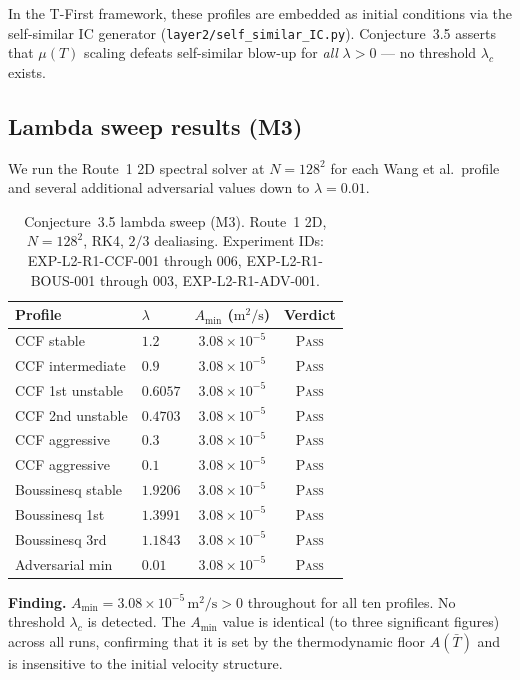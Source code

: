 \documentclass[12pt]{article}
\newcommand{\Amin}{A_{\min}}
\begin{document}
In the T-First framework, these profiles are embedded as initial conditions via the
self-similar IC generator (\texttt{layer2/self\_similar\_IC.py}).  Conjecture~3.5
asserts that $\mu(T)$ scaling defeats self-similar blow-up for \emph{all}
$\lambda > 0$ --- no threshold $\lambda_c$ exists.

\subsection{Lambda sweep results (M3)}
\label{ssec:lambda-sweep}

We run the Route~1 2D spectral solver at $N = 128^2$ for each Wang et al.\ profile
and several additional adversarial values down to $\lambda = 0.01$.

\begin{table}[ht]
  \centering
  \caption{Conjecture~3.5 lambda sweep (M3). Route~1 2D, $N=128^2$, RK4, $2/3$
    dealiasing. Experiment IDs: EXP-L2-R1-CCF-001 through 006, EXP-L2-R1-BOUS-001
    through 003, EXP-L2-R1-ADV-001.}
  \label{tab:lambda-sweep}
  \begin{tabular}{llcc}
    \toprule
    Profile & $\lambda$ & $A_{\min}$ ($\mathrm{m}^2/\mathrm{s}$) & Verdict \\
    \midrule
    CCF stable        & $1.2$   & $3.08\times10^{-5}$ & \textsc{Pass} \\
    CCF intermediate  & $0.9$   & $3.08\times10^{-5}$ & \textsc{Pass} \\
    CCF 1st unstable  & $0.6057$& $3.08\times10^{-5}$ & \textsc{Pass} \\
    CCF 2nd unstable  & $0.4703$& $3.08\times10^{-5}$ & \textsc{Pass} \\
    CCF aggressive    & $0.3$   & $3.08\times10^{-5}$ & \textsc{Pass} \\
    CCF aggressive    & $0.1$   & $3.08\times10^{-5}$ & \textsc{Pass} \\
    Boussinesq stable & $1.9206$& $3.08\times10^{-5}$ & \textsc{Pass} \\
    Boussinesq 1st    & $1.3991$& $3.08\times10^{-5}$ & \textsc{Pass} \\
    Boussinesq 3rd    & $1.1843$& $3.08\times10^{-5}$ & \textsc{Pass} \\
    Adversarial min   & $0.01$  & $3.08\times10^{-5}$ & \textsc{Pass} \\
    \bottomrule
  \end{tabular}
\end{table}

\textbf{Finding.} $\Amin = 3.08\times10^{-5}\,\mathrm{m}^2/\mathrm{s} > 0$
throughout for all ten profiles.  No threshold $\lambda_c$ is detected.  The
$\Amin$ value is identical (to three significant figures) across all runs,
confirming that it is set by the thermodynamic floor $A(\bar{T})$ and is
insensitive to the initial velocity structure.
\end{document}
